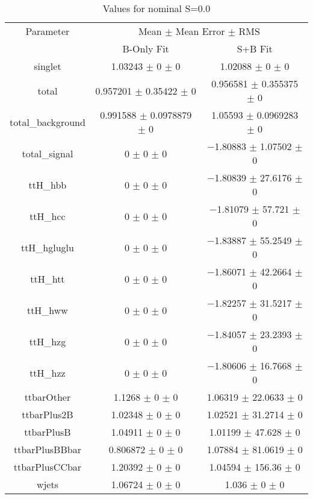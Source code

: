 \begin{table}
\centering
\caption{Values for nominal S=0.0}
\begin{tabular}{ccc}
\toprule
Parameter & \multicolumn{2}{c}{Mean $\pm$ Mean Error $\pm$ RMS}\\
 & B-Only Fit & S+B Fit\\
\midrule
singlet & \num{1.03243} $\pm$ \num{0} $\pm$ \num{0} & \num{1.02088} $\pm$ \num{0} $\pm$ \num{0}\\
total & \num{0.957201} $\pm$ \num{0.35422} $\pm$ \num{0} & \num{0.956581} $\pm$ \num{0.355375} $\pm$ \num{0}\\
total\_background & \num{0.991588} $\pm$ \num{0.0978879} $\pm$ \num{0} & \num{1.05593} $\pm$ \num{0.0969283} $\pm$ \num{0}\\
total\_signal & \num{0} $\pm$ \num{0} $\pm$ \num{0} & \num{-1.80883} $\pm$ \num{1.07502} $\pm$ \num{0}\\
ttH\_hbb & \num{0} $\pm$ \num{0} $\pm$ \num{0} & \num{-1.80839} $\pm$ \num{27.6176} $\pm$ \num{0}\\
ttH\_hcc & \num{0} $\pm$ \num{0} $\pm$ \num{0} & \num{-1.81079} $\pm$ \num{57.721} $\pm$ \num{0}\\
ttH\_hgluglu & \num{0} $\pm$ \num{0} $\pm$ \num{0} & \num{-1.83887} $\pm$ \num{55.2549} $\pm$ \num{0}\\
ttH\_htt & \num{0} $\pm$ \num{0} $\pm$ \num{0} & \num{-1.86071} $\pm$ \num{42.2664} $\pm$ \num{0}\\
ttH\_hww & \num{0} $\pm$ \num{0} $\pm$ \num{0} & \num{-1.82257} $\pm$ \num{31.5217} $\pm$ \num{0}\\
ttH\_hzg & \num{0} $\pm$ \num{0} $\pm$ \num{0} & \num{-1.84057} $\pm$ \num{23.2393} $\pm$ \num{0}\\
ttH\_hzz & \num{0} $\pm$ \num{0} $\pm$ \num{0} & \num{-1.80606} $\pm$ \num{16.7668} $\pm$ \num{0}\\
ttbarOther & \num{1.1268} $\pm$ \num{0} $\pm$ \num{0} & \num{1.06319} $\pm$ \num{22.0633} $\pm$ \num{0}\\
ttbarPlus2B & \num{1.02348} $\pm$ \num{0} $\pm$ \num{0} & \num{1.02521} $\pm$ \num{31.2714} $\pm$ \num{0}\\
ttbarPlusB & \num{1.04911} $\pm$ \num{0} $\pm$ \num{0} & \num{1.01199} $\pm$ \num{47.628} $\pm$ \num{0}\\
ttbarPlusBBbar & \num{0.806872} $\pm$ \num{0} $\pm$ \num{0} & \num{1.07884} $\pm$ \num{81.0619} $\pm$ \num{0}\\
ttbarPlusCCbar & \num{1.20392} $\pm$ \num{0} $\pm$ \num{0} & \num{1.04594} $\pm$ \num{156.36} $\pm$ \num{0}\\
wjets & \num{1.06724} $\pm$ \num{0} $\pm$ \num{0} & \num{1.036} $\pm$ \num{0} $\pm$ \num{0}\\
\bottomrule
\end{tabular}
\end{table}